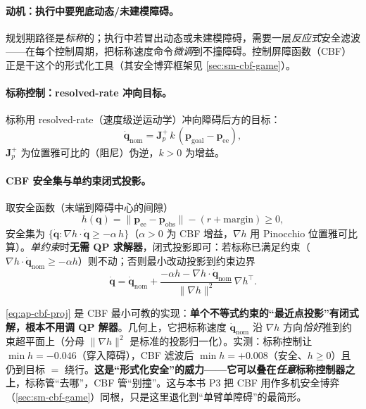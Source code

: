 \paragraph{动机：执行中要兜底动态/未建模障碍。}
规划期路径是\emph{标称}的；执行中若冒出动态或未建模障碍，需要一层\emph{反应式}安全滤波——在每个控制周期，把标称速度命令\emph{微调}到不撞障碍。控制屏障函数（CBF）正是干这个的形式化工具（其安全博弈框架见 \cref{sec:sm-cbf-game}）。

\paragraph{标称控制：resolved-rate 冲向目标。}
标称用 resolved-rate（速度级逆运动学）冲向障碍后方的目标：
\begin{equation}
  \dot{\mathbf{q}}_{\mathrm{nom}}=\mathbf{J}_p^{+}\,k\,(\mathbf{p}_{\mathrm{goal}}-\mathbf{p}_{\mathrm{ee}}),
  \label{eq:ap-resolved-rate}
\end{equation}
$\mathbf{J}_p^{+}$ 为位置雅可比的（阻尼）伪逆，$k>0$ 为增益。

\paragraph{CBF 安全集与单约束闭式投影。}
取安全函数（末端到障碍中心的间隙）
\begin{equation}
  h(\mathbf{q})=\|\mathbf{p}_{\mathrm{ee}}-\mathbf{p}_{\mathrm{obs}}\|-(r+\mathrm{margin})\ge 0,
  \label{eq:ap-cbf-h}
\end{equation}
安全集为 $\{\dot{\mathbf{q}}:\nabla h\cdot\dot{\mathbf{q}}\ge -\alpha\,h\}$（$\alpha>0$ 为 CBF 增益，$\nabla h$ 用 Pinocchio 位置雅可比算）。\emph{单约束}时\textbf{无需 QP 求解器}，闭式投影即可：若标称已满足约束（$\nabla h\cdot\dot{\mathbf{q}}_{\mathrm{nom}}\ge -\alpha h$）则不动；否则最小改动投影到约束边界
\begin{equation}
  \dot{\mathbf{q}}=\dot{\mathbf{q}}_{\mathrm{nom}}+\frac{-\alpha h-\nabla h\cdot\dot{\mathbf{q}}_{\mathrm{nom}}}{\|\nabla h\|^2}\,\nabla h^\top.
  \label{eq:ap-cbf-proj}
\end{equation}

\begin{insight}\label{ins:ap-cbf}
\cref{eq:ap-cbf-proj} 是 CBF 最小可教的实现：\textbf{单个不等式约束的“最近点投影”有闭式解，根本不用调 QP 解器}。几何上，它把标称速度 $\dot{\mathbf{q}}_{\mathrm{nom}}$ 沿 $\nabla h$ 方向\emph{恰好}推到约束超平面上（分母 $\|\nabla h\|^2$ 是标准的投影归一化）。实测：标称控制让 $\min h=-0.046$（穿入障碍），CBF 滤波后 $\min h=+0.008$（安全、$h\ge0$）且仍到目标 $=$ 绕行。\textbf{这是“形式化安全”的威力——它可以叠在\emph{任意}标称控制器之上}，标称管“去哪”，CBF 管“别撞”。这与本书 P3 把 CBF 用作多机安全博弈（\cref{sec:sm-cbf-game}）同根，只是这里退化到“单臂单障碍”的最简形。
\end{insight}

